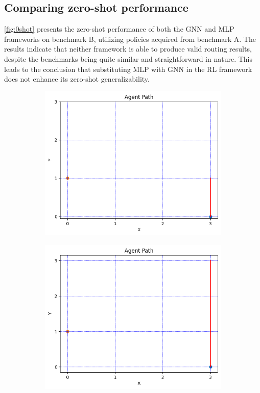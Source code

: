 \documentclass[letterpaper]{article}
\begin{document}
\subsection{Comparing zero-shot performance} \label{m:0} 
\autoref{fig:0shot} presents the zero-shot performance of both the GNN and MLP frameworks on benchmark B, utilizing policies acquired from benchmark A. The results indicate that neither framework is able to produce valid routing results, despite the benchmarks being quite similar and straightforward in nature. This leads to the conclusion that substituting MLP with GNN in the RL framework does not enhance its zero-shot generalizability.

\begin{figure}[h!]
    \centering
    \begin{subfigure}[b]{0.45\textwidth}
        \includegraphics[width=\textwidth]{figure/gnn_0shot.png}
        \caption{}
    \end{subfigure}
    \begin{subfigure}[b]{0.45\textwidth}
        \includegraphics[width=\textwidth]{figure/mlp_0shot.png}

\end{subfigure}
\end{figure}
\end{document}
